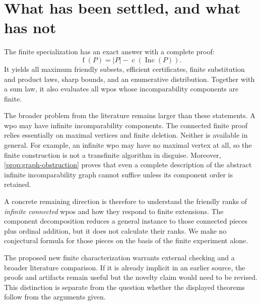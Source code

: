 \documentclass[11pt,letterpaper]{article}
\theoremstyle{definition}
\theoremstyle{remark}
\newcommand{\fot}{\operatorname{f}}
\newcommand{\Inc}{\operatorname{Inc}}
\newcommand{\cc}{\operatorname{c}}
\begin{document}
\section{What has been settled, and what has not}
\label{sec:scope}
The finite specialization has an exact answer with a complete proof:
\[
 \fot(P)=|P|-\cc(\Inc(P)).
\]
It yields all maximum friendly subsets, efficient certificates, finite
substitution and product laws, sharp bounds, and an enumerative distribution.
Together with a sum law, it also evaluates all wpos whose incomparability
components are finite.

The broader problem from the literature remains larger than these statements.
A wpo may have infinite incomparability components. The connected finite
proof relies essentially on maximal vertices and finite deletion. Neither
is available in general. For example, an infinite wpo may have no maximal
vertex at all, so the finite construction is not a transfinite algorithm
in disguise. Moreover, \cref{prop:graph-obstruction} proves that even a
complete description of the abstract infinite incomparability graph cannot
suffice unless its component order is retained.

A concrete remaining direction is therefore to understand the friendly ranks
of \emph{infinite connected} wpos and how they respond to finite extensions.
The component decomposition reduces a general instance to those connected
pieces plus ordinal addition, but it does not calculate their ranks. We
make no conjectural formula for those pieces on the basis of the finite
experiment alone.

The proposed new finite characterization warrants external checking and a
broader literature comparison. If it is already implicit in an earlier
source, the proofs and artifacts remain useful but the novelty claim would
need to be revised. This distinction is separate from the question whether
the displayed theorems follow from the arguments given.

\appendix
{}
\end{document}
